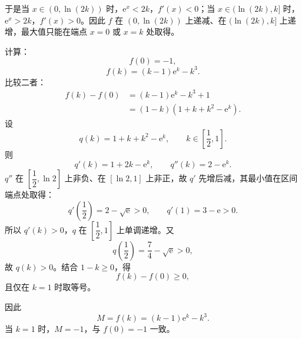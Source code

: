 \begin{answer}
于是当 $x\in(0,\ln(2k))$ 时，$\mathrm e^x<2k$，$f'(x)<0$；当 $x\in(\ln(2k),k]$ 时，$\mathrm e^x>2k$，$f'(x)>0$。因此 $f$ 在 $(0,\ln(2k))$ 上递减、在 $(\ln(2k),k]$ 上递增，最大值只能在端点 $x=0$ 或 $x=k$ 处取得。

计算：
\nopagebreak[4]
\[f(0)=-1,\]
\nopagebreak[4]
\[f(k)=(k-1)\mathrm e^k-k^3.\]
比较二者：
\nopagebreak[4]
\[\begin{aligned}
f(k)-f(0)
&=(k-1)\mathrm e^k-k^3+1\\
&=(1-k)(1+k+k^2-\mathrm e^k).
\end{aligned}\]
设
\nopagebreak[4]
\[q(k)=1+k+k^2-\mathrm e^k,\qquad k\in\left[\frac12,1\right].\]
则
\nopagebreak[4]
\[q'(k)=1+2k-\mathrm e^k,\qquad q''(k)=2-\mathrm e^k.\]
$q''$ 在 $\left[\dfrac12,\ln2\right]$ 上非负、在 $[\ln2,1]$ 上非正，故 $q'$ 先增后减，其最小值在区间端点处取得：
\nopagebreak[4]
\[q'\left(\frac12\right)=2-\sqrt{\mathrm e}>0,\qquad q'(1)=3-\mathrm e>0.\]
所以 $q'(k)>0$，$q$ 在 $\left[\dfrac12,1\right]$ 上单调递增。又
\nopagebreak[4]
\[q\left(\frac12\right)=\frac74-\sqrt{\mathrm e}>0,\]
故 $q(k)>0$。结合 $1-k\geqslant0$，得
\nopagebreak[4]
\[f(k)-f(0)\geqslant0,\]
且仅在 $k=1$ 时取等号。

因此
\nopagebreak[4]
\[M=f(k)=(k-1)\mathrm e^k-k^3.\]
当 $k=1$ 时，$M=-1$，与 $f(0)=-1$ 一致。



\end{answer}